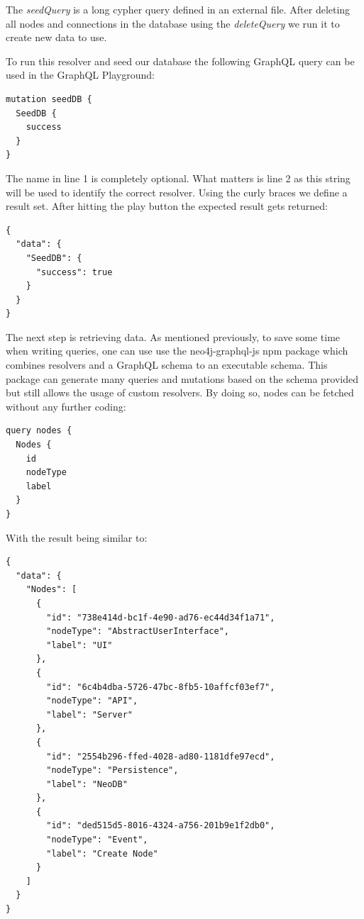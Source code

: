The \emph{seedQuery} is a long cypher query defined in an external file. After deleting all nodes and connections in the database using the \emph{deleteQuery} we run it to create new data to use.

To run this resolver and seed our database the following GraphQL query can be used in the GraphQL Playground:
\lstset{language=GraphQL}
\begin{lstlisting}[caption={Seeding the DB through GraphQL Playground}, label={exSeed}]
mutation seedDB {
  SeedDB {
    success
  }
}
\end{lstlisting}
The name in line 1 is completely optional. What matters is line 2 as this string will be used to identify the correct resolver. Using the curly braces we define a result set. After hitting the play button the expected result gets returned:
\begin{lstlisting}[caption={Seeding Result}, label={exResSeed}]
{
  "data": {
    "SeedDB": {
      "success": true
    }
  }
}
\end{lstlisting}

The next step is retrieving data. As mentioned previously, to save some time when writing queries, one can use use the neo4j-graphql-js npm package which combines resolvers and a GraphQL schema to an executable schema. This package can generate many queries and mutations based on the schema provided but still allows the usage of custom resolvers.
By doing so, nodes can be fetched without any further coding:

\begin{lstlisting}[caption={Fetching Nodes}, label={exFetch}]
query nodes {
  Nodes {
    id
    nodeType
    label
  }
}
\end{lstlisting}

With the result being similar to:
\begin{lstlisting}[caption={Result Set}, label={exResFetch}]
{
  "data": {
    "Nodes": [
      {
        "id": "738e414d-bc1f-4e90-ad76-ec44d34f1a71",
        "nodeType": "AbstractUserInterface",
        "label": "UI"
      },
      {
        "id": "6c4b4dba-5726-47bc-8fb5-10affcf03ef7",
        "nodeType": "API",
        "label": "Server"
      },
      {
        "id": "2554b296-ffed-4028-ad80-1181dfe97ecd",
        "nodeType": "Persistence",
        "label": "NeoDB"
      },
      {
        "id": "ded515d5-8016-4324-a756-201b9e1f2db0",
        "nodeType": "Event",
        "label": "Create Node"
      }
    ]
  }
}
\end{lstlisting}

